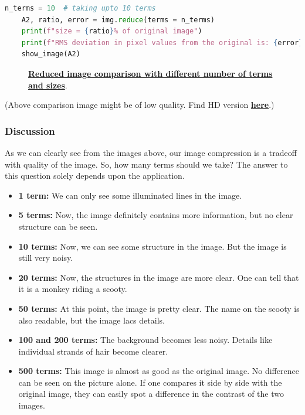 		\begin{lstlisting}[language=Python, caption={Reducing the image}, label={lst:g_monkey_10}]
	n_terms = 10  # taking upto 10 terms
	A2, ratio, error = img.reduce(terms = n_terms)
	print(f"size = {ratio}% of original image")
	print(f"RMS deviation in pixel values from the original is: {error}")
	show_image(A2)\end{lstlisting}

		\begin{figure}[H]
			\centering
			\caption{\href{https://github.com/PeithonKing/comp_phys_P346/blob/main/static/monkey_evolution.png}{\textbf{Reduced image comparison with different number of terms and sizes}}.}
			\label{fig:g_monkey_evol}
		\end{figure}

		(Above comparison image might be of low quality. Find HD version \href{https://github.com/PeithonKing/comp_phys_P346/blob/main/static/monkey_evolution.png}{\textbf{here}}.)

		\subsubsection{Discussion}

			As we can clearly see from the images above, our image compression is a tradeoff with quality of the image. So, how many terms should we take? The answer to this question solely depends upon the application.

			\begin{itemize}
				\item \textbf{1 term:} We can only see some illuminated lines in the image.
				\item \textbf{5 terms:} Now, the image definitely contains more information, but no clear structure can be seen.
				\item \textbf{10 terms:} Now, we can see some structure in the image. But the image is still very noisy.
				\item \textbf{20 terms:} Now, the structures in the image are more clear. One can tell that it is a monkey riding a scooty.
				\item \textbf{50 terms:} At this point, the image is pretty clear. The name on the scooty is also readable, but the image lacs details.
				\item \textbf{100 and 200 terms:} The background becomes less noisy. Details like individual strands of hair become clearer.
				\item \textbf{500 terms:} This image is almost as good as the original image. No difference can be seen on the picture alone. If one compares it side by side with the original image, they can easily spot a difference in the contrast of the two images.
			\end{itemize}

